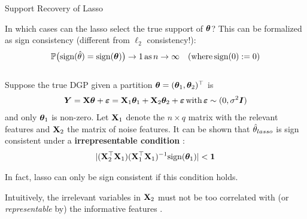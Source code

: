 \documentclass[11pt,compress,t,notes=noshow, xcolor=table]{beamer}
\begin{document}
 


\begin{vbframe}{Support Recovery of Lasso}
\begin{small}
In which cases can the lasso select the true support of $\bm{\theta}$? This can be formalized as sign consistency (different from $\ell_2$ consistency!): 
\begin{align*}
\mathbb{P}\big(\text{sign}(\hat{\theta})=\text{sign}(\bm{\theta})\big) \to 1 \, \text{as} \, n \to \infty \quad (\text{where}\,\text{sign}(0):=0) 
\end{align*}
\\
Suppose the true DGP given a partition $\bm{\theta}=(\bm{\theta}_1,\bm{\theta}_2)^{\top}$ is 
\begin{align*}
    \bm{Y}=\mathbf{X}\bm{\theta} + \bm{\varepsilon} = \mathbf{X}_1 \bm{\theta}_1 + \mathbf{X}_2 \bm{\theta}_2 + \bm{\varepsilon}\,\text{with}\,\bm{\varepsilon}\sim (0,\sigma^2 \boldsymbol{I})
\end{align*}
and only $\bm{\theta}_1$ is non-zero.
\vspace{0.1cm}
Let $\mathbf{X}_1$ denote the $n \times q$ matrix with the relevant features and $\mathbf{X}_2$ the matrix of noise features. It can be shown that $\hat{\theta}_{lasso}$ is sign consistent under a \textbf{irrepresentable condition} :
\begin{align*}
    \vert (\Xmat_2^{\top} \Xmat_1)(\Xmat_1^{\top} \Xmat_1)^{-1} \text{sign}(\thetab_1)\vert < \bm{1} %
\end{align*}

In fact, lasso can only be sign consistent if this condition holds.

Intuitively, the irrelevant variables in $\mathbf{X}_2$ must not be too correlated with (or \textit{representable} by) the informative features .
\end{small}
\end{vbframe}

\endlecture
\end{document}
